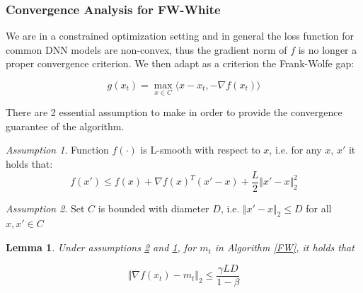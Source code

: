 \documentclass[10pt,twocolumn,letterpaper, english]{article}
\theoremstyle{definition}
\theoremstyle{plain}
\theoremstyle{plain}
\newtheorem{lemma}{Lemma}[subsection]
\theoremstyle{plain}
\theoremstyle{plain}
\theoremstyle{remark}
\theoremstyle{remark}
\newtheorem{ass}{Assumption}[subsection]
\theoremstyle{definition}
\theoremstyle{definition}
\theoremstyle{definition}
\theoremstyle{definition}
\begin{document}
\subsubsection{Convergence Analysis for FW-White}

We are in a constrained optimization setting and in general the loss function for common DNN models are non-convex, thus the gradient norm of $f$ is no longer a proper convergence criterion. We then adapt as a criterion the Frank-Wolfe gap:

\begin{equation} \label{gap}
    g(x_t)= \max_{x \in C} \langle  x-x_t, - \nabla f(x_t) \rangle
\end{equation}

There are 2 essential assumption to make in order to provide the convergence guarantee of the algorithm.

\begin{ass}\label{ass1}
Function $f(\cdot)$ is L-smooth with respect to $x$, i.e. for any $x$, $x'$ it holds that:
\begin{equation*}
    f(x') \le f(x) + \nabla f(x)^T (x' - x) + \frac{L}{2} \Vert x' -x \Vert_{2}^2
\end{equation*}
\end{ass}




\begin{ass}\label{ass2}
Set $C$ is bounded with diameter $D$, i.e. $\Vert x' -x \Vert_{2} \le D$ for all $x, x' \in C$

\end{ass}

\begin{lemma}
Under assumptions \ref{ass2} and \ref{ass1}, for $m_t$ in Algorithm \ref{FW}, it holds that

\begin{equation*}
    \Vert \nabla f(x_t) - m_t \Vert_{2} \le \frac{\gamma LD}{ 1 - \beta}
\end{equation*}
\end{lemma}
\end{document}
